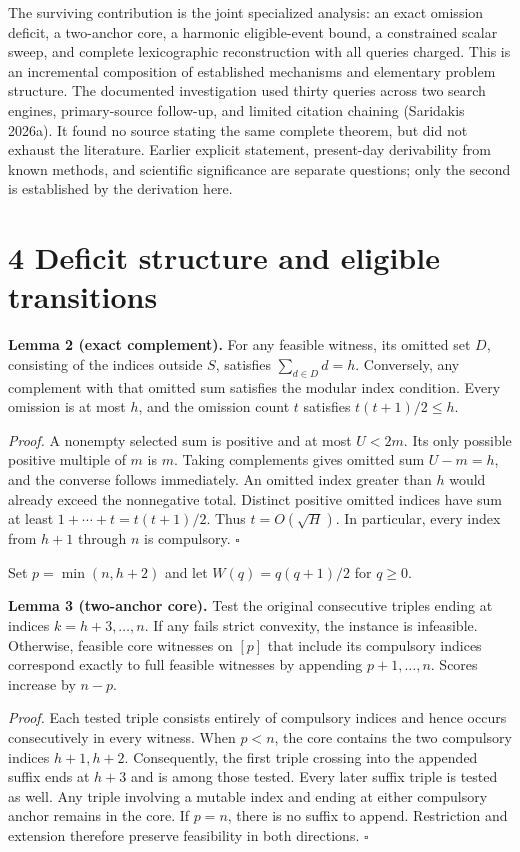 \documentclass[
  11pt,
  letterpaper,
]{article}
\begin{document}
The surviving contribution is the joint specialized analysis: an exact
omission deficit, a two-anchor core, a harmonic eligible-event bound, a
constrained scalar sweep, and complete lexicographic reconstruction with
all queries charged. This is an incremental composition of established
mechanisms and elementary problem structure. The documented
investigation used thirty queries across two search engines,
primary-source follow-up, and limited citation chaining (Saridakis
2026a). It found no source stating the same complete theorem, but did
not exhaust the literature. Earlier explicit statement, present-day
derivability from known methods, and scientific significance are
separate questions; only the second is established by the derivation
here.

\hypertarget{deficit-structure-and-eligible-transitions}{%
\section{4 Deficit structure and eligible
transitions}\label{deficit-structure-and-eligible-transitions}}

\textbf{Lemma 2 (exact complement).} For any feasible witness, its
omitted set \(D\), consisting of the indices outside \(S\), satisfies
\(\sum_{d\in D}d=h\). Conversely, any complement with that omitted sum
satisfies the modular index condition. Every omission is at most \(h\),
and the omission count \(t\) satisfies \(t(t+1)/2\leq h\).

\emph{Proof.} A nonempty selected sum is positive and at most \(U<2m\).
Its only possible positive multiple of \(m\) is \(m\). Taking
complements gives omitted sum \(U-m=h\), and the converse follows
immediately. An omitted index greater than \(h\) would already exceed
the nonnegative total. Distinct positive omitted indices have sum at
least \(1+\cdots+t=t(t+1)/2\). Thus \(t=O(\sqrt H)\). In particular,
every index from \(h+1\) through \(n\) is compulsory. \(\square\)

Set \(p=\min(n,h+2)\) and let \(W(q)=q(q+1)/2\) for \(q\geq0\).

\textbf{Lemma 3 (two-anchor core).} Test the original consecutive
triples ending at indices \(k=h+3,\ldots,n\). If any fails strict
convexity, the instance is infeasible. Otherwise, feasible core
witnesses on \([p]\) that include its compulsory indices correspond
exactly to full feasible witnesses by appending \(p+1,\ldots,n\). Scores
increase by \(n-p\).

\emph{Proof.} Each tested triple consists entirely of compulsory indices
and hence occurs consecutively in every witness. When \(p<n\), the core
contains the two compulsory indices \(h+1,h+2\). Consequently, the first
triple crossing into the appended suffix ends at \(h+3\) and is among
those tested. Every later suffix triple is tested as well. Any triple
involving a mutable index and ending at either compulsory anchor remains
in the core. If \(p=n\), there is no suffix to append. Restriction and
extension therefore preserve feasibility in both directions. \(\square\)
\end{document}
